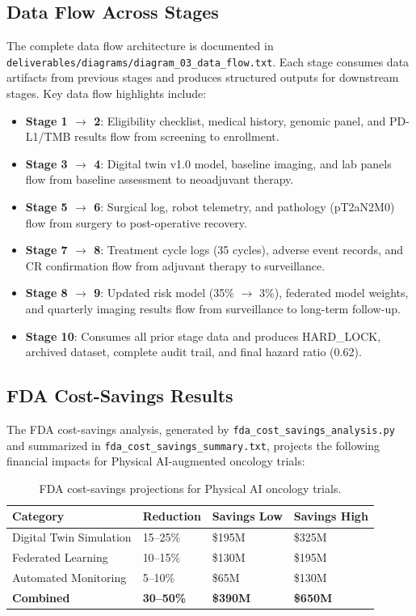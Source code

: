 \documentclass{article}
\begin{document}
\subsection{Data Flow Across Stages}

The complete data flow architecture is documented in \texttt{deliverables/diagrams/diagram\_03\_data\_flow.txt}. Each stage consumes data artifacts from previous stages and produces structured outputs for downstream stages. Key data flow highlights include:

\begin{itemize}[leftmargin=*]
\item \textbf{Stage 1 $\rightarrow$ 2}: Eligibility checklist, medical history, genomic panel, and PD-L1/TMB results flow from screening to enrollment.
\item \textbf{Stage 3 $\rightarrow$ 4}: Digital twin v1.0 model, baseline imaging, and lab panels flow from baseline assessment to neoadjuvant therapy.
\item \textbf{Stage 5 $\rightarrow$ 6}: Surgical log, robot telemetry, and pathology (pT2aN2M0) flow from surgery to post-operative recovery.
\item \textbf{Stage 7 $\rightarrow$ 8}: Treatment cycle logs (35 cycles), adverse event records, and CR confirmation flow from adjuvant therapy to surveillance.
\item \textbf{Stage 8 $\rightarrow$ 9}: Updated risk model (35\% $\rightarrow$ 3\%), federated model weights, and quarterly imaging results flow from surveillance to long-term follow-up.
\item \textbf{Stage 10}: Consumes all prior stage data and produces HARD\_LOCK, archived dataset, complete audit trail, and final hazard ratio (0.62).
\end{itemize}

\subsection{FDA Cost-Savings Results}

The FDA cost-savings analysis, generated by \texttt{fda\_cost\_savings\_analysis.py} and summarized in \texttt{fda\_cost\_savings\_summary.txt}, projects the following financial impacts for Physical AI-augmented oncology trials:

\begin{table}[H]
\centering
\caption{FDA cost-savings projections for Physical AI oncology trials.}
\label{tab:cost-savings}
\small
\begin{tabularx}{\textwidth}{@{}L{4cm}R{2cm}R{2cm}R{2cm}@{}}
\toprule
\textbf{Category} & \textbf{Reduction} & \textbf{Savings Low} & \textbf{Savings High} \\
\midrule
Digital Twin Simulation & 15--25\% & \$195M & \$325M \\
Federated Learning & 10--15\% & \$130M & \$195M \\
Automated Monitoring & 5--10\% & \$65M & \$130M \\
\midrule
\textbf{Combined} & \textbf{30--50\%} & \textbf{\$390M} & \textbf{\$650M} \\
\bottomrule
\end{tabularx}
\end{table}
\end{document}
